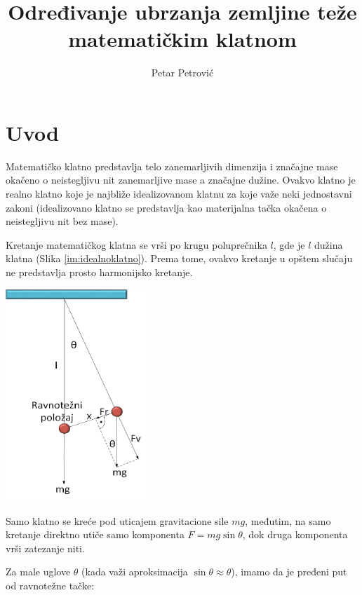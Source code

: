 

\title{Određivanje ubrzanja zemljine teže matematičkim klatnom}
\author{Petar Petrović}



\maketitle

\section{Uvod}

Matematičko klatno predstavlja telo zanemarljivih dimenzija i značajne mase okačeno o neistegljivu nit zanemarljive mase a značajne dužine. Ovakvo klatno je realno klatno koje je najbliže idealizovanom klatnu za koje važe neki jednostavni zakoni (idealizovano klatno se predstavlja kao materijalna tačka okačena o neistegljivu nit bez mase).
\par
Kretanje matematičkog klatna se vrši po krugu poluprečnika $l$, gde je $l$ dužina klatna (Slika \ref{im:idealnoklatno}). Prema tome, ovakvo kretanje u opštem slučaju ne predstavlja prosto harmonijsko kretanje.

\begin{center}
    \label{im:idealnoklatno}
    \includegraphics[height=8cm,keepaspectratio]{klatno.png}
\end{center}

Samo klatno se kreće pod uticajem gravitacione sile $mg$, međutim, na samo kretanje direktno utiče samo komponenta $F = mg \sin \theta$, dok druga komponenta vrši zatezanje niti.
\par
Za male uglove $\theta$ (kada važi aproksimacija $\sin \theta \approx \theta$), imamo da je pređeni put od ravnotežne tačke:

